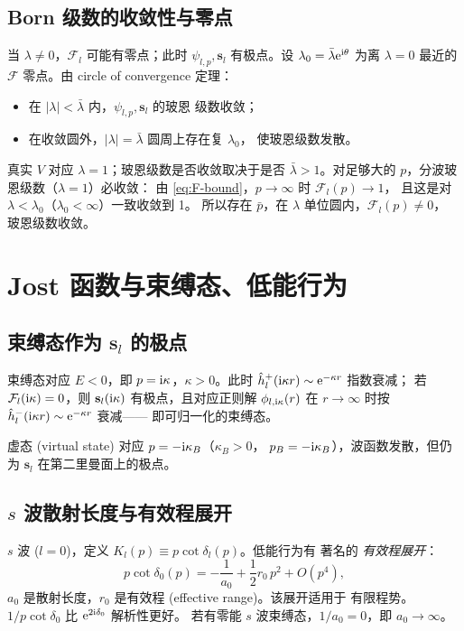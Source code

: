 \subsection{Born 级数的收敛性与零点}

当 $\lambda\ne0$，$\mathcal F_l$ 可能有零点；此时 $\psi_{l,p},\mathbf s_l$
有极点。设 $\lambda_0=\bar\lambda\mathrm{e}^{\mathrm{i}\theta}$ 为离 $\lambda=0$
最近的 $\mathcal F$ 零点。由 circle of convergence 定理：
\begin{itemize}
\item 在 $|\lambda|<\bar\lambda$ 内，$\psi_{l,p},\mathbf s_l$ 的玻恩
  级数收敛；
\item 在收敛圆外，$|\lambda|=\bar\lambda$ 圆周上存在复 $\lambda_0$，
  使玻恩级数发散。
\end{itemize}
真实 $V$ 对应 $\lambda=1$；玻恩级数是否收敛取决于是否
$\bar\lambda>1$。对足够大的 $p$，分波玻恩级数（$\lambda=1$）必收敛：
由 \eqref{eq:F-bound}，$p\to\infty$ 时 $\mathcal F_l(p)\to 1$，
且这是对 $\lambda<\lambda_0$（$\lambda_0<\infty$）一致收敛到 1。
所以存在 $\bar p$，在 $\lambda$ 单位圆内，$\mathcal F_l(p)\ne0$，
玻恩级数收敛。

\section{Jost 函数与束缚态、低能行为}\label{sec:Jost-low}

\subsection{束缚态作为 $\mathbf s_l$ 的极点}

束缚态对应 $E<0$，即 $p=\mathrm{i}\kappa$，$\kappa>0$。此时
$\hat h_l^+(\mathrm{i}\kappa r)\sim \mathrm{e}^{-\kappa r}$ 指数衰减；
若 $\mathcal F_l(\mathrm{i}\kappa)=0$，则 $\mathbf s_l(\mathrm{i}\kappa)$
有极点，且对应正则解 $\phi_{l,\mathrm{i}\kappa}(r)$ 在 $r\to\infty$
时按 $\hat h_l^-(\mathrm{i}\kappa r)\sim\mathrm{e}^{-\kappa r}$ 衰减——
即可归一化的束缚态。

虚态 (virtual state) 对应 $p=-\mathrm{i}\kappa_B$（$\kappa_B>0$，
$p_B=-\mathrm{i}\kappa_B$），波函数发散，但仍为
$\mathbf s_l$ 在第二里曼面上的极点。

\subsection{$s$ 波散射长度与有效程展开}

$s$ 波 ($l=0$)，定义 $K_l(p)\equiv p\cot\delta_l(p)$。低能行为有
著名的 \emph{有效程展开}：
\begin{equation}\label{eq:eff-range}
p\cot\delta_0(p)= -\frac{1}{a_0}+\frac{1}{2}r_0\,p^2+O(p^4),
\end{equation}
$a_0$ 是散射长度，$r_0$ 是有效程 (effective range)。该展开适用于
有限程势。$1/p\cot\delta_0$ 比 $\mathrm{e}^{2\mathrm{i}\delta_0}$ 解析性更好。
若有零能 $s$ 波束缚态，$1/a_0=0$，即 $a_0\to\infty$。


